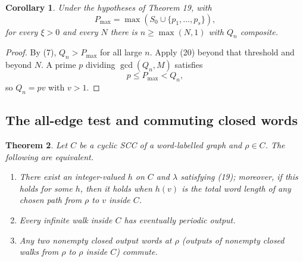 \documentclass[11pt,reqno]{amsart}
\newtheorem{theorem}{Theorem}
\newtheorem{corollary}[theorem]{Corollary}
\theoremstyle{definition}
\theoremstyle{remark}
\begin{document}
\begin{samepage}
\begin{corollary}\leavevmode\label{thm:20}
Under the hypotheses of Theorem 19, with
\[
P_{\max}=\max(S_0\cup\{p_1,\ldots,p_s\}),
\]
for every \(\xi>0\) and
every \(N\) there is \(n\ge\max(N,1)\) with \(Q_n\) composite.
\label{thm-end:20}
\end{corollary}
\end{samepage}

\begin{proof}\leavevmode\label{proof:20}
By (7), \(Q_n>P_{\max}\) for all large \(n\). Apply (20)
beyond that threshold and beyond \(N\). A prime \(p\) dividing
\(\gcd(Q_n,M)\) satisfies
\[
p\le P_{\max}<Q_n,
\]
so \(Q_n=pv\) with
\(v>1\). \qedhere
\end{proof}

\subsection{The all-edge test and commuting closed words}\label{sec:4.6}

\begin{samepage}
\begin{theorem}\leavevmode\label{thm:21}
Let \(C\) be a cyclic SCC of a word-labelled graph and
\(\rho\in C\). The following are equivalent.

\begin{enumerate}
\def\labelenumi{(\alph{enumi})}
\item
  There exist an integer-valued \(h\) on \(C\) and \(\lambda\)
  satisfying (19); moreover, if this holds for some \(h\), then it holds
  when \(h(v)\) is the total word length of any chosen path from \(\rho\)
  to \(v\) inside \(C\).
\item
  Every infinite walk inside \(C\) has eventually periodic output.
\item
  Any two nonempty closed output words at \(\rho\) (outputs of nonempty
  closed walks from \(\rho\) to \(\rho\) inside \(C\)) commute.
\end{enumerate}
\label{thm-end:21}
\end{theorem}
\end{samepage}
\end{document}
